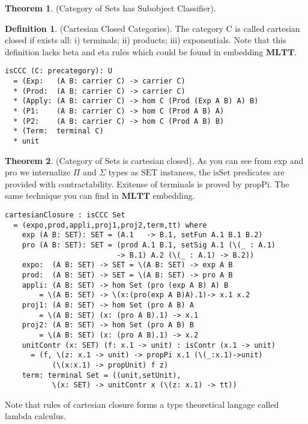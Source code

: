 \documentclass{article}
\theoremstyle{definition}
\newtheorem{definition}{Definition}
\newtheorem{theorem}{Theorem}
\begin{document}
\begin{theorem} (Category of Sets has Subobject Classifier).
\end{theorem}

\begin{definition} (Cartesian Closed Categories).
The category $\mathrm{C}$ is called cartesian closed if exists all:
i) terminals; ii) products; iii) exponentials. Note that this definition
lacks beta and eta rules which could be found in embedding $\mathbf{MLTT}$.
\begin{lstlisting}
isCCC (C: precategory): U
  = (Exp:   (A B: carrier C) -> carrier C)
  * (Prod:  (A B: carrier C) -> carrier C)
  * (Apply: (A B: carrier C) -> hom C (Prod (Exp A B) A) B)
  * (P1:    (A B: carrier C) -> hom C (Prod A B) A)
  * (P2:    (A B: carrier C) -> hom C (Prod A B) B)
  * (Term:  terminal C)
  * unit
\end{lstlisting}
\end{definition}

\begin{theorem} (Category of Sets is cartesian closed).
As you can see from exp and pro we internalize $\Pi$ and $\Sigma$ types as $\mathrm{SET}$ instances,
the $\mathrm{isSet}$ predicates are provided with contractability.
Exitense of terminals is proved by $\mathrm{propPi}$. The same technique you
can find in $\mathbf{MLTT}$ embedding.
\begin{lstlisting}
cartesianClosure : isCCC Set
  = (expo,prod,appli,proj1,proj2,term,tt) where
    exp (A B: SET): SET = (A.1   -> B.1, setFun A.1 B.1 B.2)
    pro (A B: SET): SET = (prod A.1 B.1, setSig A.1 (\(_ : A.1)
                          -> B.1) A.2 (\(_ : A.1) -> B.2))
    expo:  (A B: SET) -> SET = \(A B: SET) -> exp A B
    prod:  (A B: SET) -> SET = \(A B: SET) -> pro A B
    appli: (A B: SET) -> hom Set (pro (exp A B) A) B
        = \(A B: SET) -> \(x:(pro(exp A B)A).1)-> x.1 x.2
    proj1: (A B: SET) -> hom Set (pro A B) A
        = \(A B: SET) (x: (pro A B).1) -> x.1
    proj2: (A B: SET) -> hom Set (pro A B) B
        = \(A B: SET) (x: (pro A B).1) -> x.2
    unitContr (x: SET) (f: x.1 -> unit) : isContr (x.1 -> unit)
      = (f, \(z: x.1 -> unit) -> propPi x.1 (\(_:x.1)->unit)
           (\(x:x.1) -> propUnit) f z)
    term: terminal Set = ((unit,setUnit),
           \(x: SET) -> unitContr x (\(z: x.1) -> tt))
\end{lstlisting}
Note that rules of cartesian closure forms a type theoretical langage
called lambda calculus.
\end{theorem}
\end{document}
